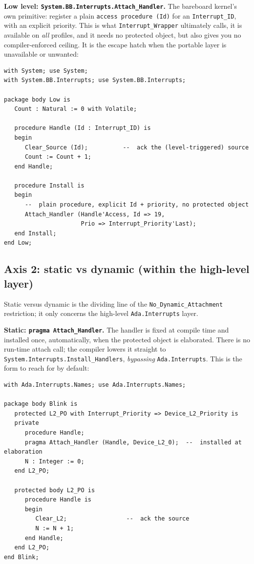 \textbf{Low level: \texttt{System.BB.Interrupts.Attach\_Handler}.} The
bareboard kernel's own primitive: register a plain \texttt{access procedure (Id)}
for an \texttt{Interrupt\_ID}, with an explicit priority. This is what
\texttt{Interrupt\_Wrapper} ultimately calls, it is available on \emph{all}
profiles, and it needs no protected object, but also gives you no
compiler-enforced ceiling. It is the escape hatch when the portable layer is
unavailable or unwanted:

\begin{lstlisting}
with System; use System;
with System.BB.Interrupts; use System.BB.Interrupts;

package body Low is
   Count : Natural := 0 with Volatile;

   procedure Handle (Id : Interrupt_ID) is
   begin
      Clear_Source (Id);          --  ack the (level-triggered) source
      Count := Count + 1;
   end Handle;

   procedure Install is
   begin
      --  plain procedure, explicit Id + priority, no protected object
      Attach_Handler (Handle'Access, Id => 19,
                      Prio => Interrupt_Priority'Last);
   end Install;
end Low;
\end{lstlisting}

\subsection{Axis 2: static vs dynamic (within the high-level layer)}

Static versus dynamic is the dividing line of the \texttt{No\_Dynamic\_Attachment}
restriction; it only concerns the high-level \texttt{Ada.Interrupts} layer.

\textbf{Static: \texttt{pragma Attach\_Handler}.} The handler is fixed at
compile time and installed once, automatically, when the protected object is
elaborated. There is no run-time attach call; the compiler lowers it straight to
\texttt{System.Interrupts.Install\_Handlers}, \emph{bypassing}
\texttt{Ada.Interrupts}. This is the form to reach for by default:

\begin{lstlisting}
with Ada.Interrupts.Names; use Ada.Interrupts.Names;

package body Blink is
   protected L2_PO with Interrupt_Priority => Device_L2_Priority is
   private
      procedure Handle;
      pragma Attach_Handler (Handle, Device_L2_0);  --  installed at elaboration
      N : Integer := 0;
   end L2_PO;

   protected body L2_PO is
      procedure Handle is
      begin
         Clear_L2;                 --  ack the source
         N := N + 1;
      end Handle;
   end L2_PO;
end Blink;
\end{lstlisting}

